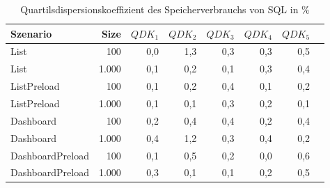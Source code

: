 
\begin{table}[ht]
\setlength{\extrarowheight}{-1pt}
\centering
\caption{Quartilsdispersionskoeffizient des Speicherverbrauchs von SQL in \%}
\begin{tabular}{lrrrrrrr}
\toprule
Szenario & Size & ${QDK_1}$ & ${QDK_2}$ & ${QDK_3}$& ${QDK_4}$ & ${QDK_5}$ \\
\midrule
	List & 100 & \cellcolor{red!1}  0,0 & \cellcolor{red!2}  1,3 & \cellcolor{red!1}  0,3 & \cellcolor{red!1}  0,3 & \cellcolor{red!1}  0,5 \\
	List & 1.000 & \cellcolor{red!1}  0,1 & \cellcolor{red!1}  0,2 & \cellcolor{red!1}  0,1 & \cellcolor{red!1}  0,3 & \cellcolor{red!1}  0,4 \\
	ListPreload & 100 & \cellcolor{red!1}  0,1 & \cellcolor{red!1}  0,2 & \cellcolor{red!1}  0,4 & \cellcolor{red!1}  0,1 & \cellcolor{red!1}  0,2 \\
	ListPreload & 1.000 & \cellcolor{red!1}  0,1 & \cellcolor{red!1}  0,1 & \cellcolor{red!1}  0,3 & \cellcolor{red!1}  0,2 & \cellcolor{red!1}  0,1 \\
	Dashboard & 100 & \cellcolor{red!1}  0,2 & \cellcolor{red!1}  0,4 & \cellcolor{red!1}  0,4 & \cellcolor{red!1}  0,2 & \cellcolor{red!1}  0,4 \\
	Dashboard & 1.000 & \cellcolor{red!1}  0,4 & \cellcolor{red!2}  1,2 & \cellcolor{red!1}  0,3 & \cellcolor{red!1}  0,4 & \cellcolor{red!1}  0,2 \\
	DashboardPreload & 100 & \cellcolor{red!1}  0,1 & \cellcolor{red!1}  0,5 & \cellcolor{red!1}  0,2 & \cellcolor{red!1}  0,0 & \cellcolor{red!1}  0,6 \\
	DashboardPreload & 1.000 & \cellcolor{red!1}  0,3 & \cellcolor{red!1}  0,1 & \cellcolor{red!1}  0,1 & \cellcolor{red!1}  0,2 & \cellcolor{red!1}  0,5 \\
\bottomrule
\end{tabular}
\label{tab:quartilsdispersionskoeffizient_speicherverbrauch_sql}
\end{table}
	